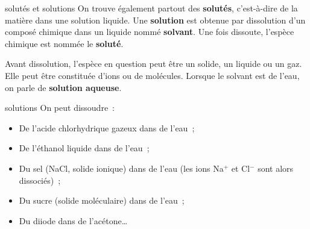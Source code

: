 \documentclass[../main/main.tex]{subfiles}
\begin{document}
\begin{tcbraster}[raster columns=2, raster equal height=rows]
    \begin{defi}[label=def:solu]{solutés et solutions}
        On trouve également partout des \textbf{solutés}, c'est-à-dire de la
        matière dans une solution liquide. Une \textbf{solution} est obtenue par
        dissolution d'un composé chimique dans un liquide nommé
        \textbf{solvant}. Une fois dissoute, l'espèce chimique est nommée le
        \textbf{soluté}.\bigbreak

        Avant dissolution, l'espèce en question peut être un solide, un liquide
        ou un gaz. Elle peut être constituée d'ions ou de molécules. Lorsque le
        solvant est de l'eau, on parle de \textbf{solution aqueuse}.
    \end{defi}
    \begin{exem}[label=exem:solution]{solutions}
        On peut dissoudre~: 
        \begin{itemize}
            \item De l'acide chlorhydrique gazeux dans de l'eau~;
            \item De l'éthanol liquide dans de l'eau~;
            \item Du sel (NaCl, solide ionique) dans de l'eau (les ions Na$^+$ et
                Cl$^-$ sont alors dissociés)~;
            \item Du sucre (solide moléculaire) dans de l'eau~;
            \item Du diiode dans de l'acétone…
        \end{itemize}
    \end{exem}
\end{tcbraster}
\end{document}
